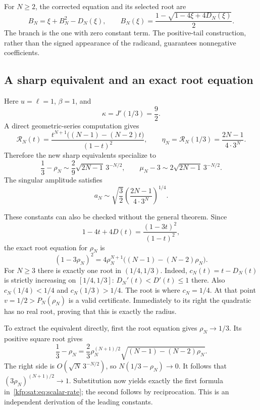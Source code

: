 \documentclass[11pt,a4paper]{article}
\theoremstyle{definition}
\theoremstyle{remark}
\newcommand{\satR}{\mathcal R}
\begin{document}
For $N\ge2$, the corrected equation and its selected root are
\begin{equation}\label{kfp:sat:eq:scalar-root}
 B_N=\xi+B_N^2-D_N(\xi),\qquad
 B_N(\xi)=\frac{1-\sqrt{1-4\xi+4D_N(\xi)}}2.
\end{equation}
The branch is the one with zero constant term. The positive-tail
construction, rather than the signed appearance of the radicand,
guarantees nonnegative coefficients.

\subsection{A sharp equivalent and an exact root equation}
Here $u=\ell=1$, $\beta=1$, and
\[
 \kappa=J'(1/3)=\frac92.
\]
A direct geometric-series computation gives
\begin{equation}\label{kfp:sat:eq:scalar-tail}
 \satR_N(t)=
 \frac{t^{N+1}\bigl((N-1)-(N-2)t\bigr)}{(1-t)^2},
 \qquad
 \eta_N=\satR_N(1/3)=\frac{2N-1}{4\cdot3^N}.
\end{equation}
Therefore the new sharp equivalents specialize to
\begin{equation}\label{kfp:sat:eq:scalar-rate}
 \boxed{\displaystyle
 \frac13-\rho_N\sim\frac29\sqrt{2N-1}\,3^{-N/2},
 \qquad
 \mu_N-3\sim2\sqrt{2N-1}\,3^{-N/2}.}
\end{equation}
The singular amplitude satisfies
\begin{equation}\label{kfp:sat:eq:scalar-amplitude}
 a_N\sim\sqrt{\frac32}\left(\frac{2N-1}{4\cdot3^N}\right)^{1/4}.
\end{equation}

These constants can also be checked without the general theorem. Since
\[
 1-4t+4D(t)=\frac{(1-3t)^2}{(1-t)^2},
\]
the exact root equation for $\rho_N$ is
\begin{equation}\label{kfp:sat:eq:scalar-polynomial}
 (1-3\rho_N)^2
 =4\rho_N^{N+1}\bigl((N-1)-(N-2)\rho_N\bigr).
\end{equation}
For $N\ge3$ there is exactly one root in $(1/4,1/3)$.
Indeed, $c_N(t)=t-D_N(t)$ is strictly increasing on $[1/4,1/3]$:
$D_N'(t)<D'(t)\le1$ there. Also $c_N(1/4)<1/4$ and
$c_N(1/3)>1/4$. The root is where $c_N=1/4$.
At that point $v=1/2>P_N(\rho_N)$ is a valid certificate.
Immediately to its right the quadratic has no real root, proving that
this is exactly the radius.

To extract the equivalent directly, first the root equation gives
$\rho_N\to1/3$. Its positive square root gives
\[
 \frac13-\rho_N
 =\frac23\rho_N^{(N+1)/2}
       \sqrt{(N-1)-(N-2)\rho_N}.
\]
The right side is $O(\sqrt N\,3^{-N/2})$, so
$N(1/3-\rho_N)\to0$. It follows that
$(3\rho_N)^{(N+1)/2}\to1$. Substitution now yields exactly the first
formula in~\eqref{kfp:sat:eq:scalar-rate}; the second follows by reciprocation.
This is an independent derivation of the leading constants.
\end{document}
